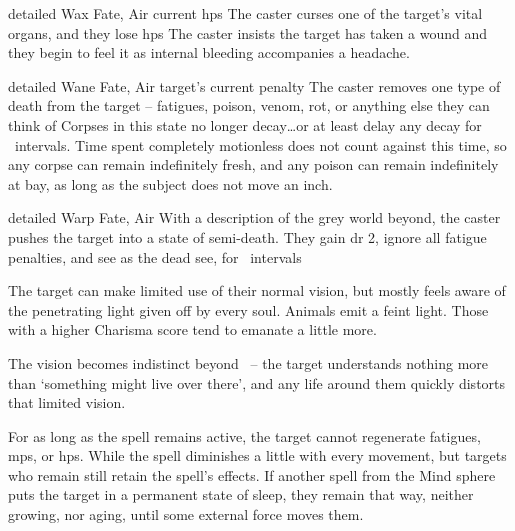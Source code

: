   {detailed}%
  {Wax}%
  {Fate, Air}%
  {current \glspl{hp}}%
  {The caster curses one of the target's vital organs, and they lose  \glspl{hp}}%
  {The caster insists the target has taken a wound and they begin to feel it as internal bleeding accompanies a headache.}

  {detailed}%
  {Wane}%
  {Fate, Air}%
  {target's current  penalty}%
  {The caster removes one type of death from the target -- \glspl{fatigue}, poison, venom, rot, or anything else they can think of}%
  {Corpses in this state no longer decay\ldots or at least delay any decay for ~\glspl{interval}. 
    Time spent completely motionless does not count against this time, so any corpse can remain indefinitely fresh, and any poison can remain indefinitely at bay, as long as the subject does not move an inch.
  }

  {detailed}%
  {Warp}%
  {Fate, Air}%
  {}%
  {With a description of the grey world beyond, the caster pushes the target into a state of semi-death.
  They gain \gls{dr} 2, ignore all \gls{fatigue} penalties, and see as the dead see, for ~\glspl{interval}}%
  {
    The target can make limited use of their normal vision, but mostly feels aware of the penetrating light given off by every soul.
    Animals emit a feint light.
    Those with a higher Charisma score tend to emanate a little more.

    The vision becomes indistinct beyond \spellRange\ -- the target understands nothing more than `something might live over there', and any life around them quickly distorts that limited vision.

    For as long as the spell remains active, the target cannot regenerate \glspl{fatigue}, \glspl{mp}, or \glspl{hp}.
    While the spell diminishes a little with every movement, but targets who remain still retain the spell's effects.
    If another spell from the Mind sphere puts the target in a permanent state of sleep, they remain that way, neither growing, nor aging, until some external force moves them.
  }
